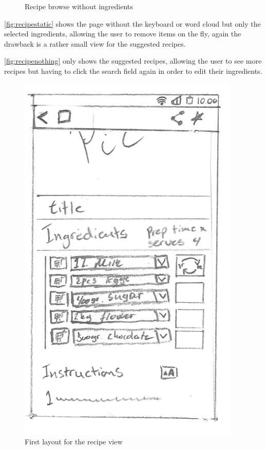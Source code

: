 \begin{figure}[H]
\begin{minipage}[b]{0.5\columnwidth}
\caption{Recipe browse without ingredients\label{fig:recipenothing}}
\end{minipage}
\end{figure}

\autoref{fig:recipestatic} shows the page without the keyboard or word cloud but only the selected ingredients, allowing the user to remove items on the fly, again the drawback is a rather small view for the suggested recipes.

\autoref{fig:recipenothing} only shows the suggested recipes, allowing the user to see more recipes but having to click the search field again in order to edit their ingredients.

\begin{figure}[H]
\begin{minipage}[b]{0.5\columnwidth}
\centering
\includegraphics[width=0.7\columnwidth]{img/prototypes/recipe_old.pdf}
\caption{First layout for the recipe view\label{fig:recipeold}}
\end{minipage}
\hspace{0.5cm}
\begin{minipage}[b]{0.5\columnwidth}

\end{minipage}
\end{figure}
